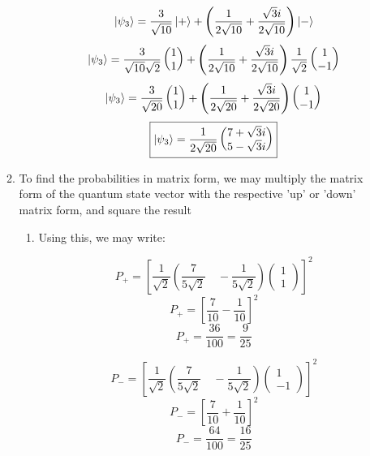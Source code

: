 \begin{enumerate}
\begin{enumerate}
\begin{enumerate}
            $$\ket{\psi_3}=\frac{3}{\sqrt{10}}\ket{+}+\left( \frac{1}{2\sqrt{10}}+\frac{\sqrt{3}i}{2\sqrt{10}} \right)\ket{-}$$
            $$\ket{\psi_3}=\frac{3}{\sqrt{10}\sqrt{2}}\left( \begin{matrix}1\\1\end{matrix} \right)+\left( \frac{1}{2\sqrt{10}}+\frac{\sqrt{3}i}{2\sqrt{10}} \right)\frac{1}{\sqrt{2}}\left( \begin{matrix} 1\\-1\end{matrix} \right)$$
            $$\ket{\psi_3}=\frac{3}{\sqrt{20}}\left( \begin{matrix}1\\1\end{matrix} \right)+\left( \frac{1}{2\sqrt{20}}+\frac{\sqrt{3}i}{2\sqrt{20}} \right)\left( \begin{matrix} 1\\-1\end{matrix} \right)$$
            $$\boxed{\ket{\psi_3}=\frac{1}{2\sqrt{20}}\left( \begin{matrix} 7+\sqrt{3}i\\5-\sqrt{3}i\end{matrix} \right)}$$

        \end{enumerate}

      \item To find the probabilities in matrix form, we may multiply the matrix form of the quantum state vector with the respective 'up' or 'down' matrix form, and square the result

        \begin{enumerate}

          \item Using this, we may write:

            $$P_+=\left[\frac{1}{\sqrt{2}}\left( \dfrac{7}{5\sqrt{2}}\quad -\dfrac{1}{5\sqrt{2}} \right)\left( \begin{matrix} 1\\ 1\end{matrix} \right)\right]^2$$
            $$P_+=\left[\frac{7}{10}-\frac{1}{10}\right]^2$$
            $$\boxed{P_+=\frac{36}{100}=\frac{9}{25}}$$

            $$P_-=\left[\frac{1}{\sqrt{2}}\left( \dfrac{7}{5\sqrt{2}}\quad -\dfrac{1}{5\sqrt{2}} \right)\left( \begin{matrix} 1\\ -1\end{matrix} \right)\right]^2$$
            $$P_-=\left[\frac{7}{10}+\frac{1}{10}\right]^2$$
            $$\boxed{P_-=\frac{64}{100}=\frac{16}{25}}$$


\end{enumerate}
\end{enumerate}
\end{enumerate}
